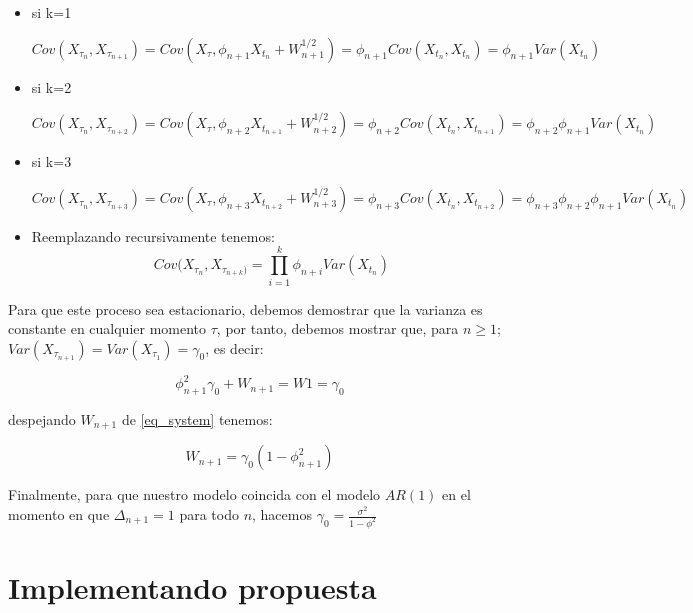 \begin{itemize}
\item si k=1

$Cov(X_{\tau_n}, X_{\tau_{n+1}}) = Cov(X_{\tau}, \phi_{n+1} X_{t_n} +W_{n+1}^{1/2}) = \phi_{n+1} Cov(X_{t_n}, X_{t_n}) = \phi_{n+1} Var(X_{t_n}) $

\item si k=2

$Cov(X_{\tau_n}, X_{\tau_{n+2}}) = Cov(X_{\tau}, \phi_{n+2} X_{t_{n+1}} +W_{n+2}^{1/2}) = \phi_{n+2} Cov(X_{t_n}, X_{t_{n+1}}) = \phi_{n+2} \phi_{n+1} Var(X_{t_n})$

\item si k=3

$Cov(X_{\tau_n}, X_{\tau_{n+3}}) = Cov(X_{\tau}, \phi_{n+3} X_{t_{n+2}} +W_{n+3}^{1/2}) = \phi_{n+3} Cov(X_{t_n}, X_{t_{n+2}}) = \phi_{n+3}\phi_{n+2} \phi_{n+1} Var(X_{t_n})$

\item Reemplazando recursivamente tenemos:
\begin{equation}
Cov(X_{\tau_n}, X_{\tau_{n+k})} = \displaystyle\prod_{i=1}^{k} \phi_{n+i}Var(X_{t_n})
\label{cov_propuesta}
\end{equation}

\end{itemize}

Para que este proceso sea estacionario, debemos demostrar que la varianza es constante en cualquier momento $\tau$, por tanto, debemos mostrar que, para $n \geq 1$; $Var(X_{\tau_{n+1}}) = Var(X_{\tau_1}) = \gamma_0$, es decir:

\begin{equation}
\phi_{n+1}^{2}\gamma_0 + W_{n+1} = W1 = \gamma_0
\label{eq_system}
\end{equation}

despejando $W_{n+1}$ de \ref{eq_system} tenemos:

\begin{equation}
W_{n+1} = \gamma_0 (1-\phi_{n+1}^2)
\label{eq:w}
\end{equation}\label{eq:w}

Finalmente, para que nuestro modelo coincida con el modelo $AR(1)$ en el momento en que $\Delta_{n+1}=1$ para todo $n$, hacemos $\gamma_0 = \frac{\sigma^2}{1-\phi^2}$

\section{Implementando propuesta}

